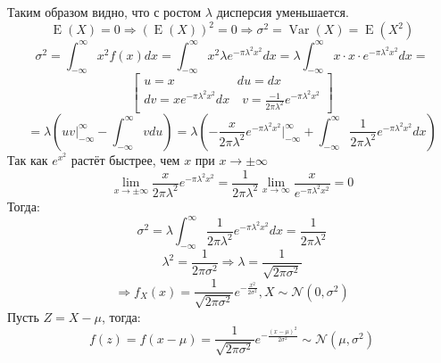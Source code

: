 \documentclass[12pt,a4paper]{article}
\DeclareMathOperator{\Var}{Var}
\DeclareMathOperator{\E}{E}
\begin{document}
Таким образом видно, что с ростом $\lambda$ дисперсия уменьшается.
\[\E(X)=0 \Rightarrow (\E(X))^2=0 \Rightarrow \sigma^2=\Var(X)=\E(X^2) \]
\[\sigma^2 =   \int_{-\infty}^{\infty} x^2 f(x) dx = 
  \int_{-\infty}^{\infty} x^2 \lambda e^{-\pi{\lambda}^2x^2}  dx =
	\lambda   \int_{-\infty}^{\infty} x\cdot x \cdot e^{-\pi{\lambda}^2x^2} dx =\]
\[ 
\left[\begin{matrix} u=x \quad \quad \quad \quad \quad du=dx\\ dv= x e^{-\pi{\lambda}^2x^2} dx \quad v=\frac{-1}{2\pi\lambda^2}e^{-\pi{\lambda}^2x^2}\end{matrix}\right]
\]
\[=\lambda \left( uv \bigg|_{-\infty}^{\infty}-   \int_{-\infty}^{\infty} vdu \right) = \lambda \left( -\frac{x}{2\pi\lambda^2}e^{-\pi{\lambda}^2x^2} \bigg|_{-\infty}^{\infty} +   \int_{-\infty}^{\infty} \frac{1}{2\pi\lambda^2}e^{-\pi{\lambda}^2x^2} dx \right)\]
Так как $e^{x^2}$ растёт быстрее, чем $x$ при $x \rightarrow \pm \infty$
\[\lim\limits_{x\to \pm \infty} \frac{x}{2\pi\lambda^2}e^{-\pi{\lambda}^2x^2} = 
\frac{1}{2\pi\lambda^2}\lim\limits_{x\to\infty} \frac{x}{ e^{-\pi{\lambda}^2x^2}}=0\]
Тогда:
\[\sigma^2 = \lambda  \int_{-\infty}^{\infty} \frac{1}{2\pi\lambda^2}e^{-\pi{\lambda}^2x^2} dx = \frac{1}{2\pi\lambda^2} \]
\[\lambda^2 = \frac{1}{2\pi\sigma^2} \Rightarrow \lambda = \frac{1}{\sqrt{2\pi\sigma^2}} \]
\[\Rightarrow f_X(x)=\frac{1}{\sqrt{2\pi\sigma^2}} e ^ {-\frac{x^2}{2\sigma^2}}, X \sim \mathcal{N}(0, \sigma^2)\]
Пусть $Z=X-\mu$, тогда:
\[f(z)=f(x-\mu)=\frac{1}{\sqrt{2\pi\sigma^2}} e ^ {-\frac{(x-\mu)^2}{2\sigma^2}} \sim \mathcal{N}(\mu, \sigma^2)\]
\vspace{0.4 in} 
\\
	\begin{tikzpicture}
		
	\end{tikzpicture}
\end{document}
